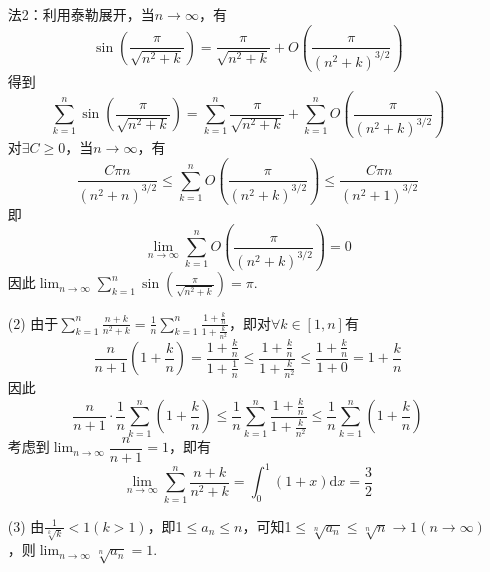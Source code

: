 \begin{xiti}
\begin{solution}
\begin{enumerate}
		法2：利用泰勒展开，当$n\rightarrow \infty$，有
		\[
		\sin \left(\frac{\pi}{\sqrt{n^{2}+k}}\right)=\frac{\pi}{\sqrt{n^{2}+k}}+O\left(\frac{\pi}{\left(n^{2}+k\right)^{3 / 2}}\right)
		\]
		得到
		\[
		\sum_{k=1}^{n} \sin \left(\frac{\pi}{\sqrt{n^{2}+k}}\right)=\sum_{k=1}^{n} \frac{\pi}{\sqrt{n^{2}+k}}+\sum_{k=1}^{n} O\left(\frac{\pi}{\left(n^{2}+k\right)^{3 / 2}}\right)
		\]
		对$\exists C\geq 0$，当$n\rightarrow \infty$，有
		\[\frac{C\pi n}{(n^2+n)^{3/2}}\leq \sum_{k=1}^nO\left(\frac\pi{(n^2+k)^{3/2}}\right)\leq\frac{C\pi n}{(n^2+1)^{3/2}}\]
		即
		\[
		\lim_{n\rightarrow\infty}\sum_{k=1}^n{O}\left(\frac{\pi}{\left(n^2+k\right)^{3/2}}\right)=0
		\]
		因此$\lim_{n\to\infty}\sum_{k=1}^n \sin\left(\frac\pi{\sqrt{n^2+k}}\right)= \pi.$
		\item[(2)] 由于$\sum_{k=1}^{n} \frac{n+k}{n^{2}+k}=\frac{1}{n} \sum_{k=1}^{n} \frac{1+\frac{k}{n}}{1+\frac{k}{n^{2}}}$，即对$\forall k\in [1,n]$有
		\[\dfrac{n}{n+1}\left(1 + \dfrac{k}{n}\right) = \dfrac{1 + \frac{k}{n}}{1+\frac{1}{n}} \le \dfrac{1+\frac{k}{n}}{1+\frac{k}{n^2}} \le \dfrac{1 + \frac{k}{n}}{1+0} = 1 + \dfrac{k}{n}\]
		因此
		\[
		\frac{n}{n+1} \cdot \frac{1}{n} \sum_{k=1}^{n}\left(1+\frac{k}{n}\right) \leq \frac{1}{n} \sum_{k=1}^{n} \frac{1+\frac{k}{n}}{1+\frac{k}{n^{2}}} \leq \frac{1}{n} \sum_{k=1}^{n}\left(1+\frac{k}{n}\right)
		\]
		考虑到$\lim_{n \to \infty}\dfrac{n}{n+1} = 1$，即有
		\[
		\lim _{n \rightarrow \infty} \sum_{k=1}^{n} \frac{n+k}{n^{2}+k}=\int_{0}^{1}(1+x) \mathrm{d} x=\frac{3}{2}
		\]
		\item[(3)] 由$\frac{1}{\sqrt[k]{k}}<1(k>1)$，即1$\leqslant a_{n} \leqslant n$，可知1$\leqslant \sqrt[n]{a_{n}} \leqslant \sqrt[n]{n} \rightarrow 1(n \rightarrow \infty)$，则$\lim _ { n \rightarrow \infty } \sqrt [ n ] { a _ { n } }=1$.
	\end{enumerate}
	

\end{solution}
\end{xiti}
